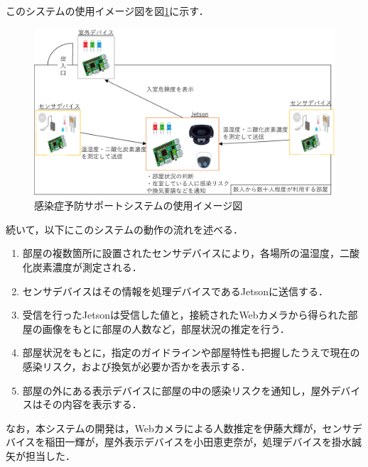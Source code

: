 このシステムの使用イメージ図を図\ref{system_image}に示す．
\begin{figure}[htbp]
    \centering
    \includegraphics[width = 15cm]{./picture/system_image.eps}
    \caption{感染症予防サポートシステムの使用イメージ図}
    \label{system_image}
    \end{figure}

続いて，以下にこのシステムの動作の流れを述べる．
\begin{enumerate}
\item 部屋の複数箇所に設置されたセンサデバイスにより，各場所の温湿度，二酸化炭素濃度が測定される．
\item センサデバイスはその情報を処理デバイスであるJetsonに送信する．
\item 受信を行ったJetsonは受信した値と，接続されたWebカメラから得られた部屋の画像をもとに部屋の人数など，部屋状況の推定を行う．
\item 部屋状況をもとに，指定のガイドラインや部屋特性も把握したうえで現在の感染リスク，および換気が必要か否かを表示する．
\item 部屋の外にある表示デバイスに部屋の中の感染リスクを通知し，屋外デバイスはその内容を表示する．
\end{enumerate}

なお，本システムの開発は，Webカメラによる人数推定を伊藤大輝が，センサデバイスを稲田一輝が，屋外表示デバイスを小田恵吏奈が，処理デバイスを掛水誠矢が担当した．






